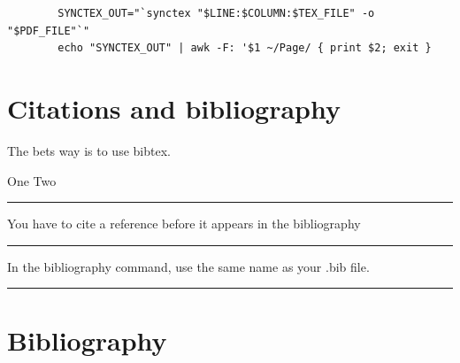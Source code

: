 \documentclass[12pt]{article}
\newcommand{\inOut}[1]{#1}                                %
\begin{document}
    \begin{lstlisting}
        SYNCTEX_OUT="`synctex "$LINE:$COLUMN:$TEX_FILE" -o "$PDF_FILE"`"
        echo "SYNCTEX_OUT" | awk -F: '$1 ~/Page/ { print $2; exit }
    \end{lstlisting}

\section{Citations and bibliography}\label{secCit}

    The bets way is to use bibtex.

    \begin{example} \label{expCite1}
        \inOut{One \cite{Aa01} Two \cite{LL01}}
    \end{example}\hrule

    \begin{remark} \label{remCite1}
        You have to cite a reference before it appears in the bibliography
    \end{remark}\hrule

    \begin{remark} \label{remCite2}
        In the bibliography command, use the same name as your .bib file.
    \end{remark}\hrule

    \section{Bibliography}\label{secBib}
    \newpage
    
\end{document}
